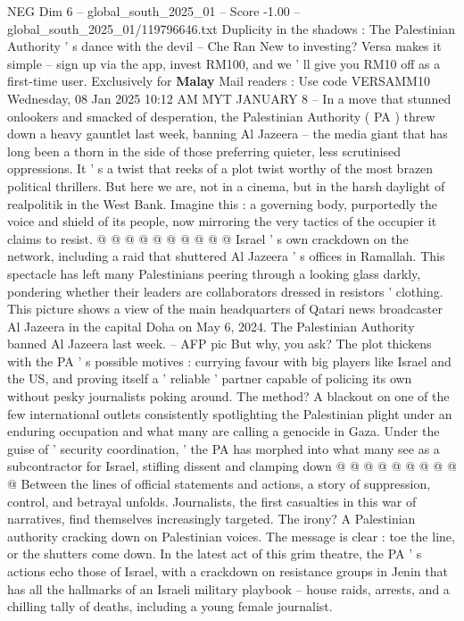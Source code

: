 \begin{textsample}{NEG Dim 6 – global\_south\_2025\_01 – Score -1.00 – global\_south\_2025\_01/119796646.txt}  \label{ex:f6_neg_009}
Duplicity in the shadows : The Palestinian Authority ' s dance with the devil -- Che Ran New to investing?
Versa makes it simple -- sign up via the app, invest RM100, and we ' ll give you RM10 off as a first-time user.
Exclusively for \textbf{Malay} Mail readers : Use code VERSAMM10 Wednesday, 08 Jan 2025 10:12 AM MYT JANUARY 8 -- In a move that stunned onlookers and smacked of desperation, the Palestinian Authority ( PA ) threw down a heavy gauntlet last week, banning Al Jazeera -- the media giant that has long been a thorn in the side of those preferring quieter, less scrutinised oppressions.
It ' s a twist that reeks of a plot twist worthy of the most brazen political thrillers.
But here we are, not in a cinema, but in the harsh daylight of realpolitik in the West Bank.
Imagine this : a governing body, purportedly the voice and shield of its people, now mirroring the very tactics of the occupier it claims to resist. @ @ @ @ @ @ @ @ @ @ Israel ' s own crackdown on the network, including a raid that shuttered Al Jazeera ' s offices in Ramallah.
This spectacle has left many Palestinians peering through a looking glass darkly, pondering whether their leaders are collaborators dressed in resistors ' clothing.
This picture shows a view of the main headquarters of Qatari news broadcaster Al Jazeera in the capital Doha on May 6, 2024.
The Palestinian Authority banned Al Jazeera last week. -- AFP pic But why, you ask?
The plot thickens with the PA ' s possible motives : currying favour with big players like Israel and the US, and proving itself a ' reliable ' partner capable of policing its own without pesky journalists poking around.
The method?
A blackout on one of the few international outlets consistently spotlighting the Palestinian plight under an enduring occupation and what many are calling a genocide in Gaza.
Under the guise of ' security coordination, ' the PA has morphed into what many see as a subcontractor for Israel, stifling dissent and clamping down @ @ @ @ @ @ @ @ @ @ Between the lines of official statements and actions, a story of suppression, control, and betrayal unfolds.
Journalists, the first casualties in this war of narratives, find themselves increasingly targeted.
The irony?
A Palestinian authority cracking down on Palestinian voices.
The message is clear : toe the line, or the shutters come down.
In the latest act of this grim theatre, the PA ' s actions echo those of Israel, with a crackdown on resistance groups in Jenin that has all the hallmarks of an Israeli military playbook -- house raids, arrests, and a chilling tally of deaths, including a young female journalist.

\end{textsample}
